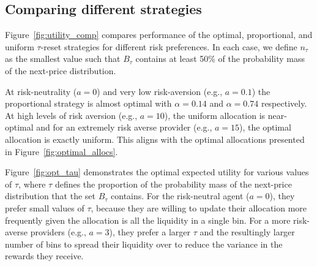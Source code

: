\documentclass[sigconf, usenames, dvipsnames]{acmart}
\begin{document}
\subsection{Comparing different strategies}



Figure~\ref{fig:utility_comp} compares performance of the optimal, proportional, and uniform $\tau$-reset strategies for different risk preferences. In each case, we define $n_{\tau}$ as the smallest value such that $B_\tau$ contains at least 50\% of the probability mass of the next-price distribution.

At risk-neutrality ($a=0$) and very low risk-aversion (e.g., $a=0.1$) the proportional strategy is almost optimal with $\alpha=0.14$ and $\alpha=0.74$ respectively. At high levels of risk aversion (e.g., $a=10$), the uniform allocation is near-optimal and for an extremely risk averse provider (e.g., $a=15$), the optimal allocation is exactly uniform. This aligns with the optimal allocations presented in Figure~\ref{fig:optimal_allocs}.

Figure~\ref{fig:opt_tau} demonstrates the optimal expected utility for various values of $\tau$, where $\tau$ defines the proportion of the probability mass of the next-price distribution that the set $B_{\tau}$ contains. For the risk-neutral agent ($a=0$), they prefer small values of $\tau$, because they are willing to update their allocation more frequently given the allocation is all the liquidity in a single bin. For a more risk-averse providers (e.g., $a=3$), they prefer a larger $\tau$ and the resultingly larger number of bins to spread their liquidity over to reduce the variance in the rewards they receive. 
\end{document}
